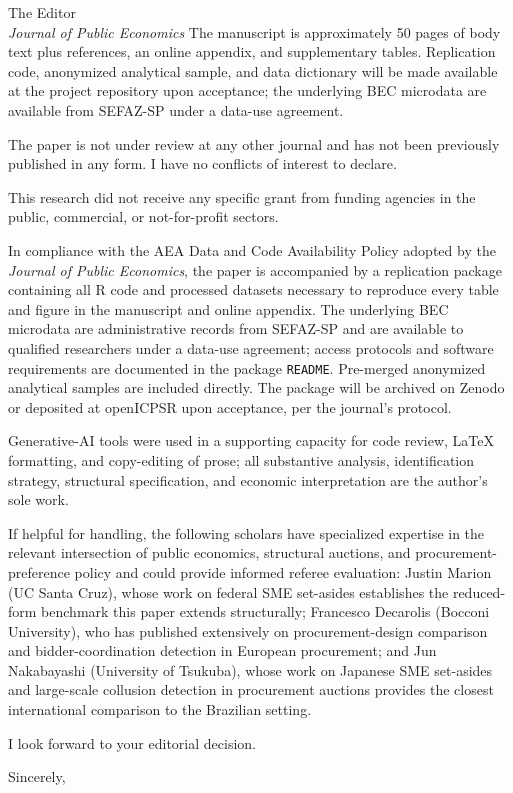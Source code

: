 \documentclass[11pt]{letter}
\begin{document}
\begin{letter}{The Editor\\\emph{Journal of Public Economics}}
The manuscript is approximately 50 pages of body text plus references, an online appendix, and supplementary tables. Replication code, anonymized analytical sample, and data dictionary will be made available at the project repository upon acceptance; the underlying BEC microdata are available from SEFAZ-SP under a data-use agreement.

The paper is not under review at any other journal and has not been previously published in any form. I have no conflicts of interest to declare.

This research did not receive any specific grant from funding agencies in the public, commercial, or not-for-profit sectors.

In compliance with the AEA Data and Code Availability Policy adopted by the \emph{Journal of Public Economics}, the paper is accompanied by a replication package containing all R code and processed datasets necessary to reproduce every table and figure in the manuscript and online appendix. The underlying BEC microdata are administrative records from SEFAZ-SP and are available to qualified researchers under a data-use agreement; access protocols and software requirements are documented in the package \texttt{README}. Pre-merged anonymized analytical samples are included directly. The package will be archived on Zenodo or deposited at openICPSR upon acceptance, per the journal's protocol.

Generative-AI tools were used in a supporting capacity for code review, \LaTeX{} formatting, and copy-editing of prose; all substantive analysis, identification strategy, structural specification, and economic interpretation are the author's sole work.

If helpful for handling, the following scholars have specialized expertise in the relevant intersection of public economics, structural auctions, and procurement-preference policy and could provide informed referee evaluation: Justin Marion (UC Santa Cruz), whose work on federal SME set-asides establishes the reduced-form benchmark this paper extends structurally; Francesco Decarolis (Bocconi University), who has published extensively on procurement-design comparison and bidder-coordination detection in European procurement; and Jun Nakabayashi (University of Tsukuba), whose work on Japanese SME set-asides and large-scale collusion detection in procurement auctions provides the closest international comparison to the Brazilian setting.

I look forward to your editorial decision.

\closing{Sincerely,}

\end{letter}
\end{document}
